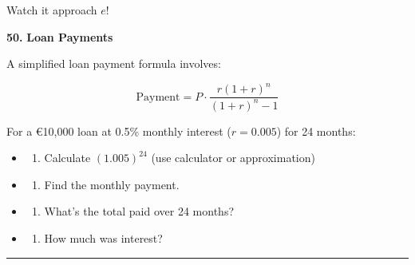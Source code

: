 \documentclass[
  11pt,
]{article}
\providecommand{\tightlist}{%
  \setlength{\itemsep}{0pt}\setlength{\parskip}{0pt}}
\begin{document}
Watch it approach \(e\)!

\textbf{50.} \textbf{Loan Payments}

A simplified loan payment formula involves:

\[\text{Payment} = P \cdot \frac{r(1+r)^n}{(1+r)^n - 1}\]

For a €10,000 loan at 0.5\% monthly interest (\(r = 0.005\)) for 24
months:

\begin{itemize}
\item
  \begin{enumerate}
  \def\labelenumi{(\alph{enumi})}
  \tightlist
  \item
    Calculate \((1.005)^{24}\) (use calculator or approximation)
  \end{enumerate}
\item
  \begin{enumerate}
  \def\labelenumi{(\alph{enumi})}
  \setcounter{enumi}{1}
  \tightlist
  \item
    Find the monthly payment.
  \end{enumerate}
\item
  \begin{enumerate}
  \def\labelenumi{(\alph{enumi})}
  \setcounter{enumi}{2}
  \tightlist
  \item
    What's the total paid over 24 months?
  \end{enumerate}
\item
  \begin{enumerate}
  \def\labelenumi{(\alph{enumi})}
  \setcounter{enumi}{3}
  \tightlist
  \item
    How much was interest?
  \end{enumerate}
\end{itemize}

\begin{center}\rule{0.5\linewidth}{0.5pt}\end{center}
\end{document}
